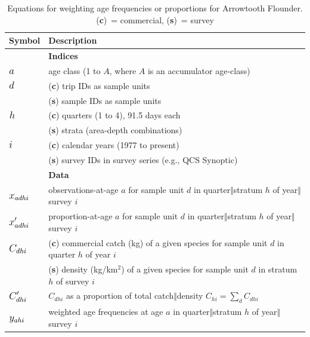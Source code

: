 \documentclass[11pt]{book}\usepackage[]{graphicx}\usepackage[]{color}
\newcommand{\eor}[2]{{#1$\Vert$#2}}
\newcommand{\bM}[1]{\mathlarger{\mathlarger{#1}}}
\begin{document}
\usefont{\encodingdefault}{\familydefault}{\seriesdefault}{\shapedefault}\small
\begin{longtable}[1]{l>{\raggedright\arraybackslash}p{} }
\caption{Equations for weighting age frequencies or proportions for Arrowtooth Flounder.\\(\textbf{c})~= commercial, (\textbf{s})~= survey}
\label{tab:wtdAges} \\
\hline
Symbol & Description \\ %
\hline
& \textbf{Indices} \\
$\bM{a}$ & age class (1 to $A$, where $A$ is an accumulator age-class) \\
$\bM{d}$ & (\textbf{c}) trip IDs as sample units \\
& (\textbf{s}) sample IDs as sample units \\
$\bM{h}$ & (\textbf{c}) quarters (1 to 4), 91.5 days each \\
& (\textbf{s}) strata (area-depth combinations) \\
$\bM{i}$ & (\textbf{c}) calendar years (1977 to present) \\
& (\textbf{s}) survey IDs in survey series (e.g., QCS Synoptic) \\ %
\hline
& \textbf{Data} \\
$\bM{x_{adhi}}$ & observations-at-age $a$ for sample unit $d$ in \eor{quarter}{stratum} $h$ of \eor{year}{survey} $i$ \\
$\bM{x^\prime_{adhi}}$ & proportion-at-age $a$ for sample unit $d$ in \eor{quarter}{stratum} $h$ of \eor{year}{survey} $i$ \\
$\bM{C_{dhi}}$ & (\textbf{c}) commercial catch (kg) of a given species for sample unit $d$ in quarter $h$ of year $i$ \\
& (\textbf{s}) density (kg/km$^2$) of a given species for sample unit $d$ in stratum $h$ of survey $i$ \\
$\bM{C^\prime_{dhi}}$ & $C_{dhi}$ as a proportion of total \eor{catch}{density} $C_{hi} = \sum_{d} C_{dhi}$ \\
$\bM{y_{ahi}}$ & weighted age frequencies at age $a$ in \eor{quarter}{stratum} $h$ of \eor{year}{survey} $i$ \\

\end{longtable}
\end{document}
